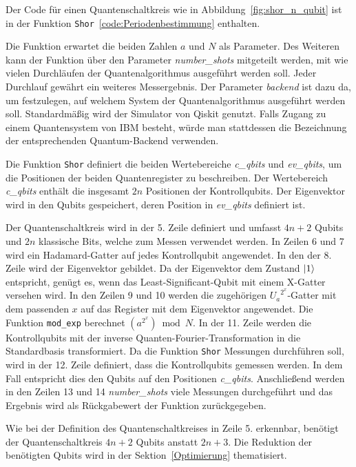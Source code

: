 \bigskip

Der Code für einen Quantenschaltkreis wie in Abbildung~\ref{fig:shor_n_qubit} ist in der Funktion 
\texttt{Shor}~\ref{code:Periodenbestimmung} enthalten.

Die Funktion erwartet die beiden Zahlen \(a\) und \(N\) als Parameter.
Des Weiteren kann der Funktion über den Parameter \textit{number\_shots} mitgeteilt werden, 
mit wie vielen Durchläufen der Quantenalgorithmus ausgeführt werden soll.
Jeder Durchlauf gewährt ein weiteres Messergebnis.
Der Parameter \textit{backend} ist dazu da, 
um festzulegen, auf welchem System der Quantenalgorithmus ausgeführt werden soll.
Standardmäßig wird der Simulator von Qiskit genutzt. 
Falls Zugang zu einem Quantensystem von IBM besteht, 
würde man stattdessen die Bezeichnung der entsprechenden Quantum-Backend verwenden.

Die Funktion \texttt{Shor} definiert die beiden Wertebereiche \textit{c\_qbits} und 
\textit{ev\_qbits}, um die Positionen der beiden Quantenregister zu beschreiben.
Der Wertebereich \textit{c\_qbits} enthält die insgesamt \(2n\) Positionen der Kontrollqubits.
Der Eigenvektor wird in den Qubits gespeichert, 
deren Position in \textit{ev\_qbits} definiert ist.

Der Quantenschaltkreis wird in der 5. Zeile definiert und umfasst \(4n+2\) Qubits und 
\(2n\) klassische Bits, welche zum Messen verwendet werden.
In Zeilen 6 und 7 wird ein Hadamard-Gatter auf jedes Kontrollqubit angewendet.
In den der 8. Zeile wird der Eigenvektor gebildet. 
Da der Eigenvektor dem Zustand \(\ket{1}\) entspricht,
genügt es, wenn das Least-Significant-Qubit mit einem X-Gatter versehen wird.
In den Zeilen 9 und 10 werden die zugehörigen \({U_a}^{2^x}\)-Gatter mit dem passenden \(x\) auf das Register mit dem Eigenvektor angewendet.
Die Funktion \texttt{mod\_exp} berechnet \((a^{2^x})\bmod N\).
In der 11. Zeile werden die Kontrollqubits mit der inverse Quanten-Fourier-Transformation in die Standardbasis transformiert.  
Da die Funktion \texttt{Shor} Messungen durchführen soll, 
wird in der 12. Zeile definiert, dass die Kontrollqubits gemessen werden.
In dem Fall entspricht dies den Qubits auf den Positionen \textit{c\_qbits}.
Anschließend werden in den Zeilen 13 und 14 \textit{number\_shots} viele Messungen durchgeführt und 
das Ergebnis wird als Rückgabewert der Funktion zurückgegeben.

Wie bei der Definition des Quantenschaltkreises in Zeile 5. erkennbar, 
benötigt der Quantenschaltkreis \(4n+2\) Qubits anstatt \(2n+3\).
Die Reduktion der benötigten Qubits wird in der Sektion~\ref{Optimierung} thematisiert. 

